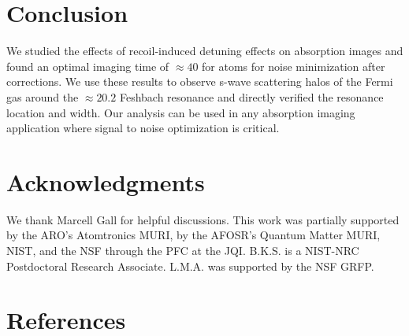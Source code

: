 \documentclass[12pt]{iopart}
\begin{document}
\section{Conclusion}
We studied the effects of recoil-induced detuning effects on absorption images and found an optimal imaging time of $\approx40$ \us{} for \K{} atoms for noise minimization after corrections. We use these results to observe s-wave scattering halos of the Fermi gas around the $\approx 20.2$ \mT{} Feshbach resonance and directly verified the resonance location and width. Our analysis can be used in any absorption imaging application where signal to noise optimization is critical. 
\section*{Acknowledgments}
We thank Marcell Gall for helpful discussions. This work was partially supported by the ARO’s Atomtronics MURI, by the
AFOSR’s Quantum Matter MURI, NIST, and the NSF through the PFC at the JQI. B.K.S. is
a NIST-NRC Postdoctoral Research Associate. L.M.A. was supported by the NSF GRFP.

\section*{References}
{}

\end{document}
